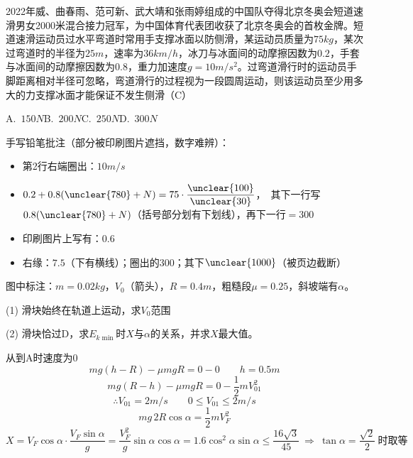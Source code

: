 \begin{problem}[贴纸印刷题]
2022年威、曲春雨、范可新、武大靖和张雨婷组成的中国队夺得北京冬奥会短道速滑男女2000米混合接力冠军，为中国体育代表团收获了北京冬奥会的首枚金牌。短道速滑运动员过水平弯道时常用手支撑冰面以防侧滑，某运动员质量为$75\unit{kg}$，某次过弯道时的半径为$25\unit{m}$，速率为$36\unit{km/h}$，冰刀与冰面间的动摩擦因数为$0.2$，手套与冰面间的动摩擦因数为$0.8$，重力加速度$g=10\unit{m/s^2}$。过弯道滑行时的运动员手脚距离相对半径可忽略，弯道滑行的过程视为一段圆周运动，则该运动员至少用多大的力支撑冰面才能保证不发生侧滑（C） %

A.\ $150\unit{N}$\qquad B.\ $200\unit{N}$\qquad C.\ $250\unit{N}$\qquad D.\ $300\unit{N}$

手写铅笔批注（部分被印刷图片遮挡，数字难辨）：
\begin{itemize}
\item 第2行右端圈出：$10\unit{m/s}$
\item $0.2+0.8(\unclear{780}+N)=75\cdot\dfrac{\unclear{100}}{\unclear{30}}$，\ 其下一行写$0.8(\unclear{780}+N)$（括号部分划有下划线），再下一行$=300$ %
\item 印刷图片上写有：$0.6$
\item 右缘：$7.5$（下有横线）；圈出的$300$；其下$\unclear{1000}$（被页边截断）
\end{itemize}
\end{problem}
图中标注：$m=0.02\unit{kg}$，$V_0$（箭头），$R=0.4\unit{m}$，粗糙段$\mu=0.25$，斜坡端有$\alpha$。
\begin{problem}
(1) 滑块始终在轨道上运动，求$V_0$范围

(2) 滑块恰过D，求$E_{k\min}$时$X$与$\alpha$的关系，并求$X$最大值。
\begin{solution}
从到A时速度为0
\[
mg(h-R)-\mu mgR=0-0\qquad h=0.5\unit{m}
\]
\[
mg(R-h)-\mu mgR=0-\frac{1}{2}mV_{01}^2 %
\]
\[
\therefore V_{01}=2\unit{m/s}\qquad 0\le V_{01}\le2\unit{m/s}
\]
\[
mg\,2R\cos\alpha=\frac{1}{2}mV_F^2
\]
\[
X=V_F\cos\alpha\cdot\frac{V_F\sin\alpha}{g}=\frac{V_F^2}{g}\sin\alpha\cos\alpha=1.6\cos^2\alpha\sin\alpha\le\frac{16\sqrt3}{45}\ \Rightarrow\ \tan\alpha=\frac{\sqrt2}{2}\ \text{时取等}
\]
\end{solution}
\end{problem}

